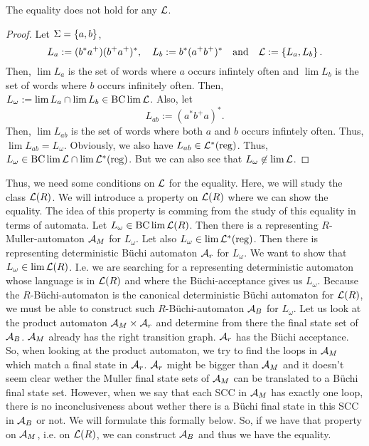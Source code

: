 \begin{example}
\label{gen:bcLimLReg-and-limL:counter-example}
The equality does not hold for any $\mathcal{L}$.
\begin{proof}
Let $\Sigma = \Set{a,b}$,
\[ L_a := (b^* a^+) (b^+ a^+)^* , \ \ \ L_b := b^* (a^+ b^+)^* \ \ \ \text{and} \ \ \ \Lang := \Set{L_a,L_b} . \]
Then, $\lim L_a$ is the set of words where $a$ occurs infintely often and $\lim L_b$ is the set of words where $b$ occurs infinitely often. Then, $L_\omega := \lim L_a \cap \lim L_b \in \operatorname{BC} \lim \mathcal{L}$. Also, let
\[ L_{ab} := (a^* b^+ a)^* . \]
Then, $\lim L_{ab}$ is the set of words where both $a$ and $b$ occurs infintely often. Thus, $\lim L_{ab} = L_\omega$. Obviously, we also have $L_{ab} \in \mathcal{L}^*(\textup{\textrm{reg}})$. Thus, $L_\omega \in \operatorname{BC} \lim \mathcal{L} \cap \lim \mathcal{L}^*(\textup{\textrm{reg}})$. But we can also see that $L_\omega \not\in \lim \mathcal{L}$.
\end{proof}
\end{example}

Thus, we need some conditions on $\mathcal{L}$ for the equality. Here, we will study the class $\mathcal{L}(R)$. We will introduce a property on $\mathcal{L}(R)$ where we can show the equality. The idea of this property is comming from the study of this equality in terms of automata. Let $L_\omega \in \operatorname{BC} \lim \mathcal{L}(R)$. Then there is a representing $R$-Muller-automaton $\mathcal{A}_M$ for $L_\omega$. Let also $L_\omega \in \lim \mathcal{L}^*(\textup{\textrm{reg}})$. Then there is representing deterministic Büchi automaton $\mathcal{A}_r$ for $L_\omega$. We want to show that $L_\omega \in \lim \mathcal{L}(R)$. I.e. we are searching for a representing deterministic automaton whose language is in $\mathcal{L}(R)$ and where the Büchi-acceptance gives us $L_\omega$. Because the $R$-Büchi-automaton is the canonical deterministic Büchi automaton for $\mathcal{L}(R)$, we must be able to construct such $R$-Büchi-automaton $\mathcal{A}_B$ for $L_\omega$. Let us look at the product automaton $\mathcal{A}_M \times \mathcal{A}_r$ and determine from there the final state set of $\mathcal{A}_B$. $\mathcal{A}_M$ already has the right transition graph. $\mathcal{A}_r$ has the Büchi acceptance. So, when looking at the product automaton, we try to find the loops in $\mathcal{A}_M$ which match a final state in $\mathcal{A}_r$. $\mathcal{A}_r$ might be bigger than $\mathcal{A}_M$ and it doesn't seem clear wether the Muller final state sets of $\mathcal{A}_M$ can be translated to a Büchi final state set. However, when we say that each SCC in $\mathcal{A}_M$ has exactly one loop, there is no inconclusiveness about wether there is a Büchi final state in this SCC in $\mathcal{A}_B$ or not. We will formulate this formally below. So, if we have that property on $\mathcal{A}_M$, i.e. on $\mathcal{L}(R)$, we can construct $\mathcal{A}_B$ and thus we have the equality.

